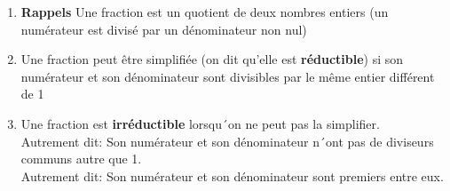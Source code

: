 
 
\begin{enumerate}
\item \textbf{Rappels} Une fraction est un quotient de deux nombres entiers (un numérateur est divisé par un dénominateur non nul)
\item Une fraction peut être simplifiée (on dit qu'elle est \textbf{réductible}) si son numérateur et son dénominateur sont divisibles par le même entier différent de 1
 \item Une fraction est \textbf{irréductible} lorsqu´on ne peut pas la simplifier. \\
 Autrement dit: Son numérateur et son dénominateur n´ont pas de diviseurs communs autre que 1. \\
 Autrement dit: Son numérateur et son dénominateur sont premiers entre eux. 
\end{enumerate}

